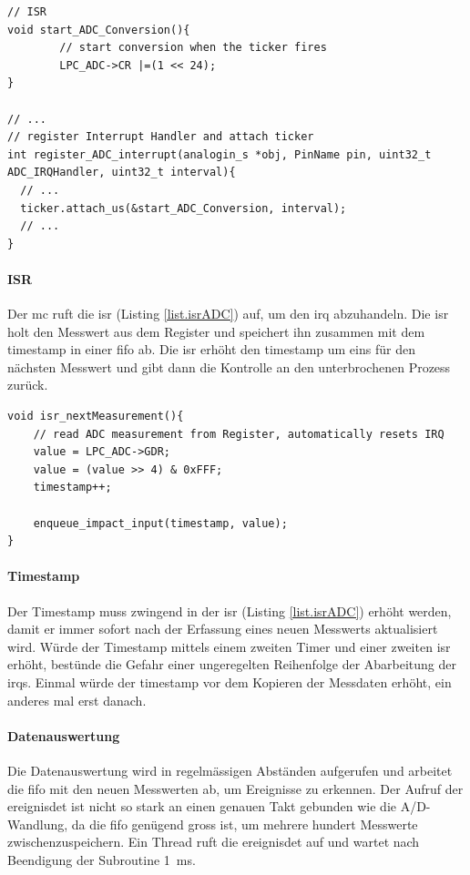 \begin{lstlisting}[caption=Timer mit Aufruf der A/D-Wandler-Funktion (ADC\_4088.cpp), label=list.tickerADC]
// ISR 
void start_ADC_Conversion(){
		// start conversion when the ticker fires
		LPC_ADC->CR |=(1 << 24);
}

// ...
// register Interrupt Handler and attach ticker
int register_ADC_interrupt(analogin_s *obj, PinName pin, uint32_t ADC_IRQHandler, uint32_t interval){
  // ...
  ticker.attach_us(&start_ADC_Conversion, interval);
  // ...
}
\end{lstlisting}

\paragraph{ISR} Der \gls{mc} ruft die \gls{isr} (Listing \ref{list.isrADC}) auf, um den \gls{irq} abzuhandeln. Die \gls{isr} holt den Messwert aus dem Register und speichert ihn zusammen mit dem \gls{timestamp} in einer \gls{fifo} ab. Die \gls{isr} erhöht den \gls{timestamp} um eins für den nächsten Messwert und gibt dann die Kontrolle an den unterbrochenen Prozess zurück.

\begin{lstlisting}[caption=ISR zur Abhandlung des ADC-Interrupt Requests (impact\_event.cpp), label=list.isrADC]
void isr_nextMeasurement(){
	// read ADC measurement from Register, automatically resets IRQ
	value = LPC_ADC->GDR;
	value = (value >> 4) & 0xFFF;
	timestamp++;
	
	enqueue_impact_input(timestamp, value);
}
\end{lstlisting}

\paragraph{Timestamp} Der Timestamp muss zwingend in der \gls{isr} (Listing \ref{list.isrADC}) erhöht werden, damit er immer sofort nach der Erfassung eines neuen Messwerts aktualisiert wird. Würde der Timestamp mittels einem zweiten Timer und einer zweiten \gls{isr} erhöht, bestünde die Gefahr einer ungeregelten Reihenfolge der Abarbeitung der \gls{irq}s. Einmal würde der \gls{timestamp} vor dem Kopieren der Messdaten erhöht, ein anderes mal erst danach.

\paragraph{Datenauswertung} Die Datenauswertung wird in regelmässigen Abständen aufgerufen und arbeitet die \gls{fifo} mit den neuen Messwerten ab, um Ereignisse zu erkennen. Der Aufruf der \gls{ereignisdet} ist nicht so stark an einen genauen Takt gebunden wie die A/D-Wandlung, da die \gls{fifo} genügend gross ist, um mehrere hundert Messwerte zwischenzuspeichern. Ein Thread ruft die \gls{ereignisdet} auf und wartet nach Beendigung der Subroutine 1~ms.

